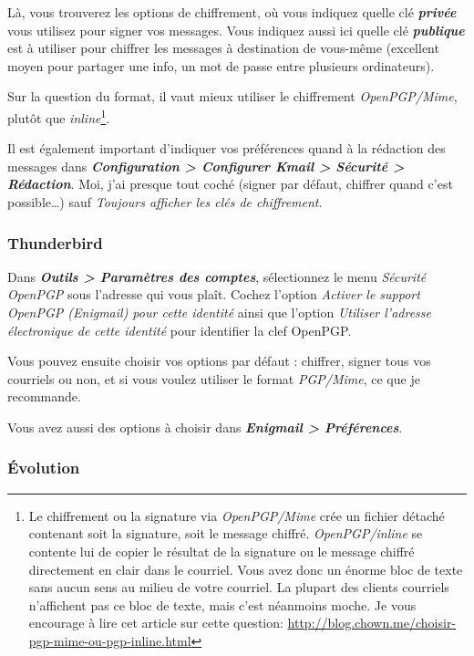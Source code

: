 Là, vous trouverez les options de chiffrement, où vous indiquez quelle
clé \textbf{\emph{privée}} vous utilisez pour signer vos messages. Vous
indiquez aussi ici quelle clé \textbf{\emph{publique}} est à utiliser
pour chiffrer les messages à destination de vous-même (excellent moyen
pour partager une info, un mot de passe entre plusieurs ordinateurs).

Sur la question du format, il vaut mieux utiliser le chiffrement \emph{OpenPGP/Mime}, plutôt que
\emph{inline}\footnote{Le chiffrement ou la signature via \emph{OpenPGP/Mime} crée un fichier détaché contenant soit la signature, soit le message chiffré.
	\emph{OpenPGP/inline} se contente lui de copier le résultat de la signature ou le message chiffré directement en clair dans le courriel.
	Vous avez donc un énorme bloc de texte sans aucun sens au milieu de votre courriel. La plupart des clients courriels n'affichent pas ce bloc de texte, mais c'est néanmoins moche. Je vous encourage à lire cet article sur cette question: \url{http://blog.chown.me/choisir-pgp-mime-ou-pgp-inline.html}}.

Il est également important d'indiquer vos préférences quand à la
rédaction des messages dans \textbf{\emph{Configuration \textgreater{}
Configurer Kmail \textgreater{} Sécurité \textgreater{} Rédaction}}.
Moi, j'ai presque tout coché (signer par défaut, chiffrer quand c'est
possible\ldots{}) sauf \emph{Toujours afficher les clés de chiffrement}.

\subsubsection{Thunderbird}\label{thunderbird}

Dans \textbf{\emph{Outils \textgreater{} Paramètres des comptes}},
sélectionnez le menu \emph{Sécurité OpenPGP} sous l'adresse qui vous
plaît. Cochez l'option \emph{Activer le support OpenPGP (Enigmail) pour
cette identité} ainsi que l'option \emph{Utiliser l'adresse électronique
de cette identité} pour identifier la clef OpenPGP.

Vous pouvez ensuite choisir vos options par défaut : chiffrer, signer
tous vos courriels ou non, et si vous voulez utiliser le format
\emph{PGP/Mime}, ce que je recommande.

Vous avez aussi des options à choisir dans \textbf{\emph{Enigmail
\textgreater{} Préférences}}.

\subsubsection{Évolution}\label{uxe9volution}


